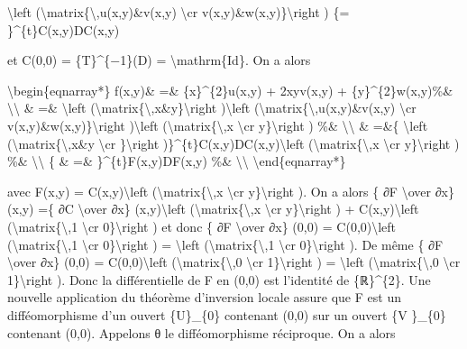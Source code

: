 \documentclass[]{article}
\begin{document}
\textbackslash{}left
(\textbackslash{}matrix\{\textbackslash{},u(x,y)\&v(x,y)
\textbackslash{}cr v(x,y)\&w(x,y)\}\textbackslash{}right ) \{=
\}\^{}\{t\}C(x,y)DC(x,y)

et C(0,0) = \{T\}\^{}\{−1\}(D) = \textbackslash{}mathrm\{Id\}. On a
alors

\textbackslash{}begin\{eqnarray*\} f(x,y)\& =\& \{x\}\^{}\{2\}u(x,y) +
2xyv(x,y) + \{y\}\^{}\{2\}w(x,y)\%\& \textbackslash{}\textbackslash{} \&
=\& \textbackslash{}left
(\textbackslash{}matrix\{\textbackslash{},x\&y\}\textbackslash{}right
)\textbackslash{}left
(\textbackslash{}matrix\{\textbackslash{},u(x,y)\&v(x,y)
\textbackslash{}cr v(x,y)\&w(x,y)\}\textbackslash{}right
)\textbackslash{}left (\textbackslash{}matrix\{\textbackslash{},x
\textbackslash{}cr y\}\textbackslash{}right ) \%\&
\textbackslash{}\textbackslash{} \& =\&\{ \textbackslash{}left
(\textbackslash{}matrix\{\textbackslash{},x\&y \textbackslash{}cr
\}\textbackslash{}right )\}\^{}\{t\}C(x,y)DC(x,y)\textbackslash{}left
(\textbackslash{}matrix\{\textbackslash{},x \textbackslash{}cr
y\}\textbackslash{}right ) \%\& \textbackslash{}\textbackslash{} \{ \&
=\& \}\^{}\{t\}F(x,y)DF(x,y) \%\& \textbackslash{}\textbackslash{}
\textbackslash{}end\{eqnarray*\}

avec F(x,y) = C(x,y)\textbackslash{}left
(\textbackslash{}matrix\{\textbackslash{},x \textbackslash{}cr
y\}\textbackslash{}right ). On a alors \{ ∂F \textbackslash{}over ∂x\}
(x,y) =\{ ∂C \textbackslash{}over ∂x\} (x,y)\textbackslash{}left
(\textbackslash{}matrix\{\textbackslash{},x \textbackslash{}cr
y\}\textbackslash{}right ) + C(x,y)\textbackslash{}left
(\textbackslash{}matrix\{\textbackslash{},1 \textbackslash{}cr
0\}\textbackslash{}right ) et donc \{ ∂F \textbackslash{}over ∂x\} (0,0)
= C(0,0)\textbackslash{}left (\textbackslash{}matrix\{\textbackslash{},1
\textbackslash{}cr 0\}\textbackslash{}right ) = \textbackslash{}left
(\textbackslash{}matrix\{\textbackslash{},1 \textbackslash{}cr
0\}\textbackslash{}right ). De même \{ ∂F \textbackslash{}over ∂x\}
(0,0) = C(0,0)\textbackslash{}left
(\textbackslash{}matrix\{\textbackslash{},0 \textbackslash{}cr
1\}\textbackslash{}right ) = \textbackslash{}left
(\textbackslash{}matrix\{\textbackslash{},0 \textbackslash{}cr
1\}\textbackslash{}right ). Donc la différentielle de F en (0,0) est
l'identité de \{ℝ\}\^{}\{2\}. Une nouvelle application du théorème
d'inversion locale assure que F est un difféomorphisme d'un ouvert
\{U\}\_\{0\} contenant (0,0) sur un ouvert \{V \}\_\{0\} contenant
(0,0). Appelons θ le difféomorphisme réciproque. On a alors
\end{document}
